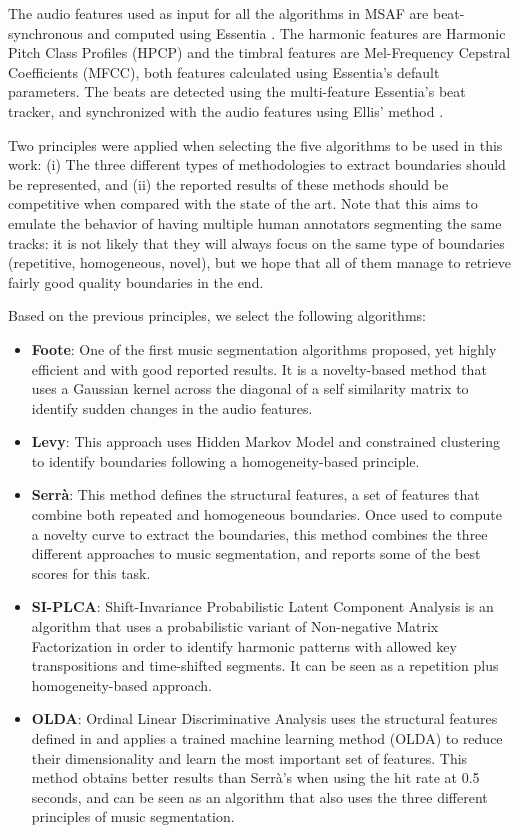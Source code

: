 \documentclass{article}
\begin{document}
The audio features used as input for all the algorithms in MSAF are beat-synchronous and computed using Essentia \cite{Bogdanov2013}.
The harmonic features are Harmonic Pitch Class Profiles (HPCP) and the timbral features are Mel-Frequency Cepstral Coefficients (MFCC), both features calculated using Essentia's default parameters.
The beats are detected using the multi-feature Essentia's beat tracker, and synchronized with the audio features using Ellis' method \cite{Ellis2007}.

Two principles were applied when selecting the five algorithms to be used in this work: (i) The three different types of methodologies to extract boundaries should be represented, and (ii) the reported results of these methods should be competitive when compared with the state of the art.
Note that this aims to emulate the behavior of having multiple human annotators segmenting the same tracks: it is not likely that they will always focus on the same type of boundaries (repetitive, homogeneous, novel), but we hope that all of them manage to retrieve fairly good quality boundaries in the end.

Based on the previous principles, we select the following algorithms:

\begin{itemize}
  \item
    \textbf{Foote}: One of the first music segmentation algorithms proposed, yet highly efficient and with good reported results\cite{Foote1999}. It is a novelty-based method that uses a Gaussian kernel across the diagonal of a self similarity matrix to identify sudden changes in the audio features.
  \item
    \textbf{Levy}: This approach uses Hidden Markov Model and constrained clustering to identify boundaries following a homogeneity-based principle\cite{Levy2008}.
  \item
    \textbf{Serr\`a}: This method defines the structural features, a set of features that combine both repeated and homogeneous boundaries. Once used to compute a novelty curve to extract the boundaries, this method combines the three different approaches to music segmentation, and reports some of the best scores for this task\cite{Serra2013}.
  \item
    \textbf{SI-PLCA}: Shift-Invariance Probabilistic Latent Component Analysis is an algorithm that uses a probabilistic variant of Non-negative Matrix Factorization in order to identify harmonic patterns with allowed key transpositions and time-shifted segments\cite{Weiss2011}. It can be seen as a repetition plus homogeneity-based approach.
  \item 
    \textbf{OLDA}: Ordinal Linear Discriminative Analysis uses the structural features defined in \cite{Serra2013} and applies a trained machine learning method (OLDA) to reduce their dimensionality and learn the most important set of features\cite{McFee2014}. This method obtains better results than Serr\`a's when using the hit rate at 0.5 seconds, and can be seen as an algorithm that also uses the three different principles of music segmentation.
\end{itemize}
\end{document}
